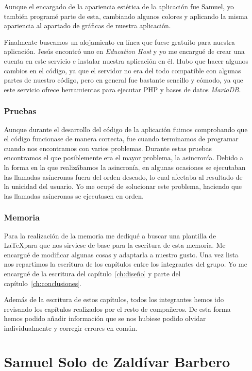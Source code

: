 Aunque el encargado de la apariencia estética de la aplicación fue Samuel, yo también programé parte de esta, cambiando algunos colores y aplicando la misma apariencia al apartado de gráficas de nuestra aplicación.\par
Finalmente buscamos un alojamiento en línea que fuese gratuito para nuestra aplicación. Jesús encontró uno en \textit{Education Host} y yo me encargué de crear una cuenta en este servicio e instalar nuestra aplicación en él. Hubo que hacer algunos cambios en el código, ya que el servidor no era del todo compatible con algunas partes de nuestro código, pero en general fue bastante sencillo y cómodo, ya que este servicio ofrece herramientas para ejecutar PHP y bases de datos \textit{MariaDB}.
\subsubsection{Pruebas}
Aunque durante el desarrollo del código de la aplicación fuimos comprobando que el código funcionase de manera correcta, fue cuando terminamos de programar cuando nos encontramos con varios problemas. Durante estas pruebas encontramos el que posiblemente era el mayor problema, la asincronía. Debido a la forma en la que realizábamos la asincronía, en algunas ocasiones se ejecutaban las llamadas asíncronas fuera del orden deseado, lo cual afectaba al resultado de la unicidad del usuario. Yo me ocupé de solucionar este problema, haciendo que las llamadas asíncronas se ejecutasen en orden.
\subsubsection{Memoria}
Para la realización de la memoria me dediqué a buscar una plantilla de \LaTeX\space para que nos sirviese de base para la escritura de esta memoria. Me encargué de modificar algunas cosas y adaptarla a nuestro gusto. Una vez lista nos repartimos la escritura de los capítulos entre los integrantes del grupo. Yo me encargué de la escritura del capítulo~\ref{ch:diseño} y parte del capítulo~\ref{ch:conclusiones}.\par
Además de la escritura de estos capítulos, todos los integrantes hemos ido revisando los capítulos realizados por el resto de compañeros. De esta forma hemos podido añadir información que se nos hubiese podido olvidar individualmente y corregir errores en común.

\section{Samuel Solo de Zaldívar Barbero}
